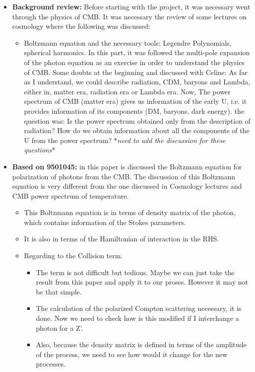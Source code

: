 \documentclass[amssymb,useAMS,prd,aps,amsmath,onecolumn,superscriptaddress,nofootinbib]{revtex4}
\begin{document}
\begin{itemize}
\item \textbf{Background review:} Before starting with the project, it was necessary went through the physics of CMB. It was necessary the review of some lectures on cosmology where the following was discussed:
	\begin{itemize}
	\item Boltzmann equation and the necessary tools: Legendre Polynomials, spherical harmonics. In this part, it was followed the multi-pole expansion of the photon equation as an exercise in order to understand the physics of CMB.  Some doubts  at the beginning and discussed with Celine: As far as I understand, we could describe radiation, CDM, baryons and Lambda, either in, matter era, radiation era or Lambda era. Now, The power spectrum of CMB (matter era) gives us information of the early U, i.e. it provides information of its components (DM, baryons, dark energy). the question was: Is the power spectrum obtained only from the description of radiation? How do we obtain information about all the components of the U from the power spectrum?  *\textit{need to add the discussion for these questions}* 
	\end{itemize}
\item \textbf{Based on 9501045:} in this paper is discussed the Boltzmann equation for polarization of photons from the CMB. The discussion of this Boltzmann equation is very different from the one discussed in Cosmology lectures and CMB power spectrum of temperature. 
\begin{itemize}
\item This Boltzmann equation is in terms of density matrix of the photon, which contains information of the Stokes parameters.
\item It is also in terms of the Hamiltonian of interaction in the RHS.  
\item Regarding to the Collision term.
		\begin{itemize}
		\item The term is not difficult but tedious. Maybe we can just take the result from this paper and apply it to our 			       proses. However it may not be that simple. 
        \item The calculation of the polarized Compton scattering necessary, it is done. Now we need to check how is this 				  modified if I interchange a photon for a Z'. 
        \item Also, because the density matrix is defined in terms of the amplitude of the process, we need to see how would 		       it change for the new processes. 

\end{itemize}
\end{itemize}
\end{itemize}
\end{document}

